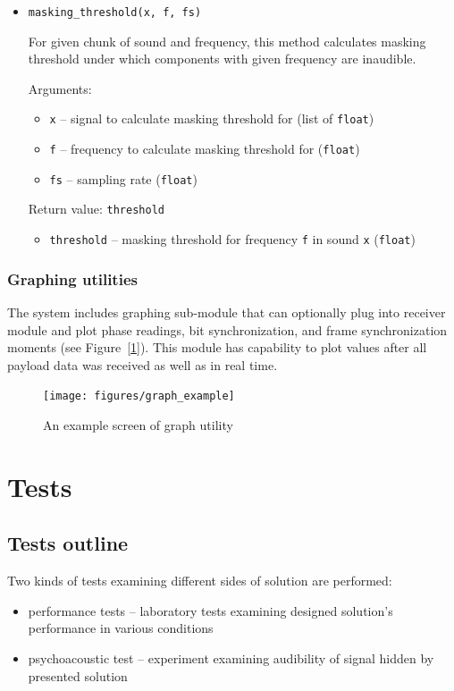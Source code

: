 \documentclass[english,bachelor,a4paper,oneside]{ppfcmthesis}
\begin{document}
\begin{itemize}
\item \verb|masking_threshold(x, f, fs)|

  For given chunk of sound and frequency, this method calculates masking threshold under which components with
  given frequency are inaudible.

  Arguments:
  \begin{itemize}
  \item \verb|x| -- signal to calculate masking threshold for (list of \verb|float|)
  \item \verb|f| -- frequency to calculate masking threshold for (\verb|float|)
  \item \verb|fs| -- sampling rate (\verb|float|)
  \end{itemize}

  Return value: \verb|threshold|
  \begin{itemize}
  \item \verb|threshold| -- masking threshold for frequency \verb|f| in sound \verb|x| (\verb|float|)
  \end{itemize}
\end{itemize}

\subsection{Graphing utilities}

The system includes graphing sub-module that can optionally plug into receiver module and plot phase readings, bit synchronization, and frame synchronization moments (see Figure~[\ref{fig:graph-utility}]).
This module has capability to plot values after all payload data was received as well as in real time.

\begin{figure}[p]
  \centering
  \texttt{[image: figures/graph\_example]}
  \caption{An example screen of graph utility}
  \label{fig:graph-utility}
\end{figure}

\chapter{Tests}
\label{chap:tests}

\section{Tests outline}

Two kinds of tests examining different sides of solution are performed:
\begin{itemize}
  \item performance tests -- laboratory tests examining designed solution's performance in various conditions
  \item psychoacoustic test -- experiment examining audibility of signal hidden by presented solution
\end{itemize}
\end{document}
